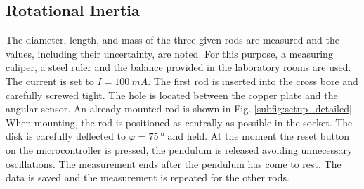         \subsection{Rotational Inertia}
            The diameter, length, and mass of the three given rods are measured and the values, including their uncertainty, are noted.
            For this purpose, a measuring caliper, a steel ruler and the balance provided in the laboratory rooms are used. The current
            is set to \(I = \SI{100}{mA}\). The first rod is inserted into the cross bore and carefully screwed tight. The hole is
            located between the copper plate and the angular sensor. An already mounted rod is shown in Fig. \cref{subfig:setup_detailed}. When
            mounting, the rod is positioned as centrally as possible in the socket. The disk is carefully deflected to
            \(\varphi = \SI{75}{\degree}\) and held. At the moment the reset button on the microcontroller is pressed, the pendulum
            is released avoiding unnecessary oscillations. The measurement ends after the pendulum has come to rest. The data is saved
            and the measurement is repeated for the other rods.